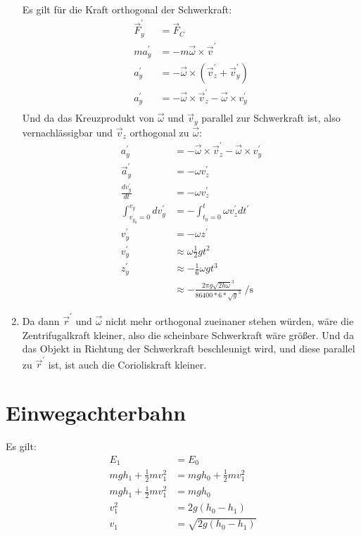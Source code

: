 \documentclass[sectionformat = aufgabe]{gadsescript}
\begin{document}
\begin{enumerate}[label=\alph*)]
		Es gilt für die Kraft orthogonal der Schwerkraft:
		\begin{align*}
			\vec F_y^\prime &= \vec F_{C}\\
			ma_y^\prime &= - m \vec \omega \times \vec v^\prime\\
			a_y^\prime &= - \vec \omega \times (\vec v_z^\prime + \vec v_y^\prime)\\
			a_y^\prime &= - \vec \omega \times \vec v_z^\prime - \vec \omega \times v_y^\prime\\
		\end{align*}
		Und da das Kreuzprodukt von $ \vec \omega $ und $ \vec v_y $ parallel zur Schwerkraft ist, also vernachlässigbar und $ \vec v_z $ orthogonal zu $ \vec \omega $:
		\begin{align*}
			a_y^\prime &= - \vec \omega \times \vec v_z^\prime - \vec \omega \times v_y^\prime\\
			\vec a_y^\prime &= - \omega v_z^\prime\\
			\frac{dv_y^\prime}{dt} &= - \omega v_z^\prime\\
			\int_{v_{y_0} = 0}^{v_y} dv_y^\prime &= - \int_{t_0 = 0}^{t} \omega v_z^\prime dt^\prime\\
			v_y^\prime &= - \omega z^\prime\\
			v_y^\prime &\approx \omega \frac{1}{2} gt^2\\
			z_y^\prime &\approx - \frac{1}{6} \omega gt^3\\
			~&\approx - \frac{2\pi g\sqrt{2h\omega}^3}{86400 * 6 * \sqrt{g}^3} \; \unit{\per\second}
		\end{align*}
	\item Da dann $ \vec r^\prime $ und $ \vec \omega $ nicht mehr orthogonal zueinaner stehen würden, wäre die Zentrifugalkraft kleiner, also die scheinbare Schwerkraft wäre größer.
		Und da das Objekt in Richtung der Schwerkraft beschleunigt wird, und diese parallel zu $ \vec r^\prime $ ist, ist auch die Corioliskraft kleiner.
\end{enumerate}

\section{Einwegachterbahn}
Es gilt:
\begin{align*}
	E_1 &= E_0\\
	mgh_1 + \frac{1}{2} m v_1^2 &= mgh_0 + \frac{1}{2} m v_1^2\\
	mgh_1 + \frac{1}{2} m v_1^2 &= mgh_0\\
	v_1^2 &= 2g(h_0 - h_1)\\
	v_1 &= \sqrt{2g(h_0 - h_1)}\\
\end{align*}
\end{document}
